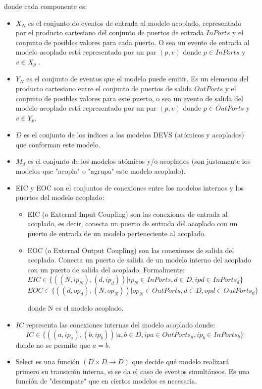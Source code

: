 \documentclass[a4paper,	11pt]{report}
\begin{document}
donde cada componente es:
\begin{itemize}
\item $X_N$ es el conjunto de eventos de entrada al modelo acoplado, representado por el producto cartesiano del conjunto de puertos de entrada $InPorts$ y el conjunto de posibles valores para cada puerto. O sea un evento de entrada al modelo acoplado está representado por un par $(p, v)$ donde $p \in InPorts$ y $v \in X_p$ .

\item $Y_N$ es el conjunto de eventos que el modelo puede emitir. Es un elemento del producto cartesiano entre el conjunto de puertos de salida $OutPorts$ y el conjunto de posibles valores para este puerto, o sea un evento de salida del modelo acoplado está representado por un par $(p, v)$ donde $p \in OutPorts$ y $v \in Y_p$.

\item $D$ es el conjunto de los índices a los modelos DEVS (atómicos y acoplados) que conforman este modelo. 

\item ${M_d}$ es el conjunto de los modelos atómicos y/o acoplados (son justamente los modelos que "acopla" o "agrupa" este modelo acoplado).

\item EIC y EOC son el conjuntos de conexiones entre los modelos internos y los puertos del modelo acoplado:
      \begin {itemize}
          \item EIC (o External Input Coupling) son las conexiones de entrada al acoplado, es decir, conecta un puerto de entrada del acoplado con un puerto de entrada de un modelo perteneciente al acoplado.
          \item EOC (o External Output Coupling) son las conexiones de salida del acoplado. Conecta un puerto de salida de un modelo interno del acoplado con un puerto de salida del acoplado. Formalmente:
          $ EIC \in \{((N, ip_N ), (d, ip_d )) | ip_N \in InPorts, d \in D, ip d \in InPorts_d \} $
          $EOC \in \{((d, op_d ), (N, op_N ))  | op_N \in OutPorts, d \in D, op d \in OutPorts_d \} $
    
    	donde N es el modelo acoplado.
      \end{itemize}

\item $IC$ representa las conexiones internas del modelo acoplado donde:
\begin{equation}
IC \in \{((a, ip_a ), (b, ip_b )) | a, b \in D, ip a \in OutPorts_a , ip_b \in InPorts_b \}
\end{equation}
donde no se permite que $a = b$.

\item Select es una función $(D \times D \to D)$ que decide qué modelo realizará primero su transición interna, si se da el caso de eventos simultáneos. Es una función de "desempate" que en ciertos modelos es necesaria.
\end{itemize}
\end{document}
